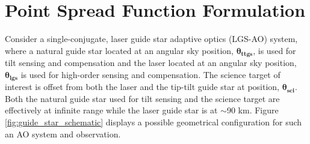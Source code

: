 \section{Point Spread Function Formulation}
\label{sec:psfform}

Consider a single-conjugate, laser guide star adaptive optics
(LGS-AO) system, where a natural guide
star located at an angular sky position, $\boldsymbol{\theta_{ttgs}}$, is used for
tilt sensing and compensation and the laser located at an angular sky position,
$\boldsymbol{\theta_{lgs}}$ is used for high-order sensing and compensation. 
The science target of interest is offset from both the laser and the
tip-tilt guide star at position, $\boldsymbol{\theta_{sci}}$.  
Both the natural guide star used for tilt sensing and the science
target are effectively at infinite range while the laser guide star is
at $\sim$90 km. 
Figure \ref{fig:guide_star_schematic} displays a possible geometrical configuration for
such an AO system and observation.


